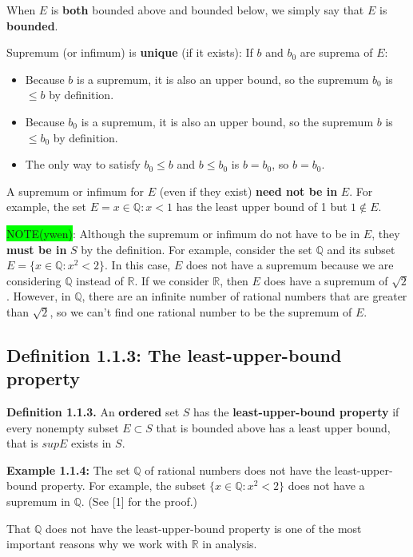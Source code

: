 \documentclass[12pt, letterpaper, oneside]{book}
\begin{document}
When $E$ is \textbf{both} bounded above and bounded below, we simply say that $E$ is \textbf{bounded}.

Supremum (or infimum) is \textbf{unique} (if it exists): If $b$ and $b_0$ are suprema of $E$:
\begin{itemize}
  \item Because $b$ is a supremum, it is also an upper bound, so the supremum $b_0$ is $\le b$ by definition.
  \item Because $b_0$ is a supremum, it is also an upper bound, so the supremum $b$ is $\le b_0$ by definition.
  \item The only way to satisfy $b_0 \le b$ and $b \le b_0$ is $b = b_0$, so $b = b_0$.
\end{itemize}

A supremum or infimum for $E$ (even if they exist) \textbf{need not be in} $E$. For example, the set $E = {x \in
  \mathbb{Q}: x < 1}$ has the least upper bound of 1 but $1 \notin E$.

\colorbox{lime}{NOTE(ywen)}: Although the supremum or infimum do not have to be in $E$, they \textbf{must be in} $S$ by
the definition. For example, consider the set $\mathbb{Q}$ and its subset $E = \{ x \in \mathbb{Q}: x^2 < 2 \}$. In
this case, $E$ does not have a supremum because we are considering $\mathbb{Q}$ instead of $\mathbb{R}$. If we consider
$\mathbb{R}$, then $E$ does have a supremum of $\sqrt{2}$. However, in $\mathbb{Q}$, there are an infinite number of
rational numbers that are greater than $\sqrt{2}$, so we can't find one rational number to be the supremum of $E$.

\subsection{Definition 1.1.3: The least-upper-bound property}

\textbf{Definition 1.1.3.} An \textbf{ordered} set $S$ has the \textbf{least-upper-bound property} if every nonempty
subset $E \subset S$ that is bounded above has a least upper bound, that is $sup E$ exists in $S$.

\textbf{Example 1.1.4:} The set $\mathbb{Q}$ of rational numbers does not have the least-upper-bound property. For
example, the subset $\{ x \in \mathbb{Q}: x^2 < 2 \}$ does not have a supremum in $\mathbb{Q}$. (See [1] for the proof.)

That $\mathbb{Q}$ does not have the least-upper-bound property is one of the most important reasons why we work with
$\mathbb{R}$ in analysis.
\end{document}

